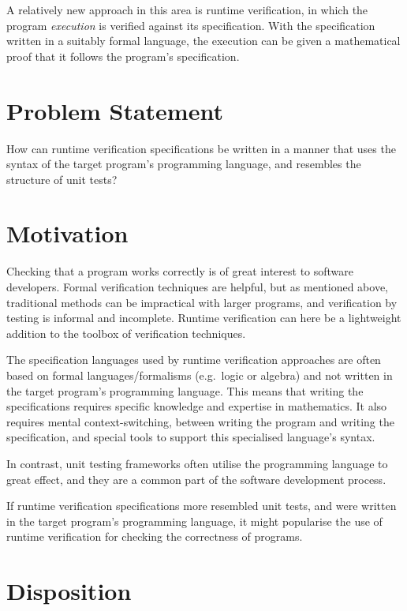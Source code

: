 \documentclass[a4paper,11pt]{kth-mag}
\begin{document}
A relatively new approach in this area is runtime verification, in which the
program \textit{execution} is verified against its specification. With the
specification written in a suitably formal language, the execution can be given
a mathematical proof that it follows the program's specification.


\section{Problem Statement} \label{section-problem-statement}

How can runtime verification specifications be written in a manner that uses
the syntax of the target program's programming language, and resembles
the structure of unit tests?


\section{Motivation}

Checking that a program works correctly is of great interest to software
developers. Formal verification techniques are helpful, but as mentioned above,
traditional methods can be impractical with larger programs, and verification
by testing is informal and incomplete. Runtime verification can here be a
lightweight addition to the toolbox of verification techniques.

The specification languages used by runtime verification approaches are often
based on formal languages/formalisms (e.g.\ logic or algebra) and not written
in the target program's programming language. This means that writing the
specifications requires specific knowledge and expertise in mathematics. It
also requires mental context-switching, between writing the program and writing
the specification, and special tools to support this specialised language's
syntax.

In contrast, unit testing frameworks often utilise the programming language to
great effect, and they are a common part of the software development process.

If runtime verification specifications more resembled unit tests, and were
written in the target program's programming language, it might popularise the
use of runtime verification for checking the correctness of programs.



\section{Disposition}
\end{document}
